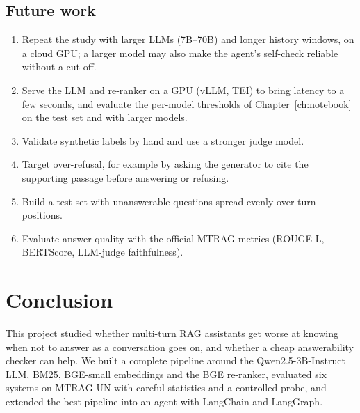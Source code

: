 \documentclass[11pt,a4paper]{report}
\begin{document}
\section{Future work}
\begin{enumerate}
\item Repeat the study with larger LLMs (7B--70B) and longer history windows, on a cloud GPU; a larger model may also make the agent's self-check reliable without a cut-off.
\item Serve the LLM and re-ranker on a GPU (vLLM, TEI) to bring latency to a few seconds, and evaluate the per-model thresholds of Chapter~\ref{ch:notebook} on the test set and with larger models.
\item Validate synthetic labels by hand and use a stronger judge model.
\item Target over-refusal, for example by asking the generator to cite the supporting passage before answering or refusing.
\item Build a test set with unanswerable questions spread evenly over turn positions.
\item Evaluate answer quality with the official MTRAG metrics (ROUGE-L, BERTScore, LLM-judge faithfulness).
\end{enumerate}

\chapter{Conclusion}
This project studied whether multi-turn RAG assistants get worse at knowing when not to answer as a conversation goes on, and whether a cheap answerability checker can help. We built a complete pipeline around the Qwen2.5-3B-Instruct LLM, BM25, BGE-small embeddings and the BGE re-ranker, evaluated six systems on MTRAG-UN with careful statistics and a controlled probe, and extended the best pipeline into an agent with LangChain and LangGraph.
\end{document}
